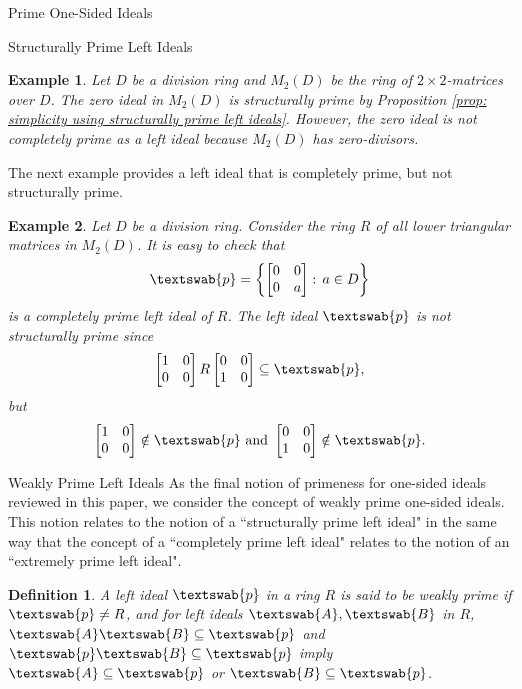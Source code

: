 \documentclass[11pt,a4paper]{article}
\theoremstyle{theorem}
\newtheorem{definition}{Definition}[section]
\newtheorem{example}{Example}[section]
\numberwithin{equation}{section}
\begin{document}
\begin{section}{Prime One-Sided Ideals}
\begin{subsection}{Structurally Prime Left Ideals}
	\begin{example}
		\label{exam: structurally, not completely}
		Let \(D\) be a division ring and \(M_2(D)\) be the ring of \(2\times 2\)-matrices over \(D\). The zero ideal in \(M_2(D)\) is structurally prime by Proposition \ref{prop: simplicity using structurally prime left ideals}. However, the zero ideal is not completely prime as a left ideal because \(M_2(D)\) has zero-divisors. 
	\end{example}
	The next example provides a left ideal that is completely prime, but not structurally prime. 
	\begin{example}
		\label{exam: not structurally, completely}
		Let \(D\) be a division ring. Consider the ring \(R\) of all lower triangular matrices in \(M_2(D)\). It is easy to check that 
		\[
			\textswab{p} = \left\lbrace \begin{bmatrix}
				0 & 0\\
				0 & a
			\end{bmatrix}: \, a\in D \right\rbrace 
		\] 
		is a completely prime left ideal of \(R\). The left ideal \(\textswab{p}\) is not structurally prime since
		\[
			\begin{bmatrix}
				1 & 0\\
				0 & 0
			\end{bmatrix} R \begin{bmatrix}
			0 & 0\\
			1 & 0
			\end{bmatrix} \subseteq \textswab{p},
		\]
		but 
		\[
			\begin{bmatrix}
				1 & 0\\
				0 & 0
			\end{bmatrix}\notin \textswab{p} \text{ and } \begin{bmatrix}
			0 & 0\\
			1 & 0
			\end{bmatrix}\notin \textswab{p}.
		\]
	\end{example}
	
	
\end{subsection}
\begin{subsection}{Weakly Prime Left Ideals}
	As the final notion of primeness for one-sided ideals reviewed in this paper, we consider the concept of weakly prime one-sided ideals. This notion relates to the notion of a ``structurally prime left ideal" in the same way that the concept of a ``completely prime left ideal"  relates to the notion of an ``extremely prime left ideal".   
	\begin{definition}\label{def: weakly prime left ideal}
		A left ideal  \( \textswab{p} \) in a  ring \( R \) is said to be \emph{weakly prime} if \( \textswab{p} \neq R \), and  for left ideals \( \textswab{A},\textswab{B}\) in \(R\), \( \textswab{A}\textswab{B}\subseteq\textswab{p}\) and \( \textswab{p}\textswab{B}\subseteq\textswab{p}\) imply \( \textswab{A}\subseteq\textswab{p}\) or \( \textswab{B}\subseteq\textswab{p}\).
	\end{definition}
	

\end{subsection}
\end{section}
\end{document}
